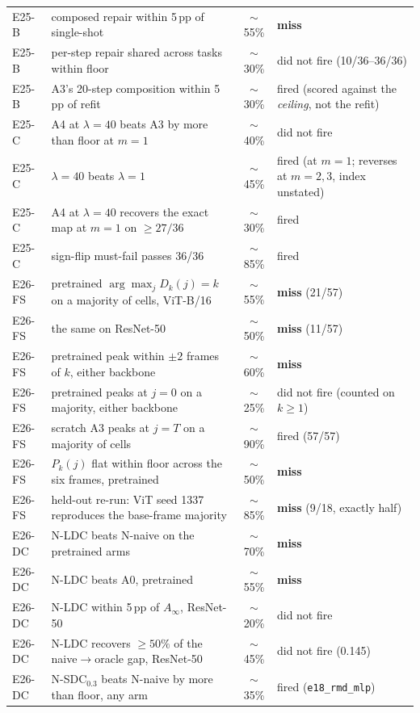 \begin{center}
\begin{tabular}{@{}llcl@{}}
E25-B & composed repair within 5\,pp of single-shot & $\sim$55\% & \textbf{miss} \\
E25-B & per-step repair shared across tasks within floor & $\sim$30\% & did not fire (10/36--36/36) \\
E25-B & A3's 20-step composition within 5\,pp of refit & $\sim$30\% & fired (scored against the \emph{ceiling}, not the refit) \\
E25-C & A4 at $\lambda=40$ beats A3 by more than floor at $m=1$ & $\sim$40\% & did not fire \\
E25-C & $\lambda=40$ beats $\lambda=1$ & $\sim$45\% & fired (at $m=1$; reverses at $m=2,3$, index unstated) \\
E25-C & A4 at $\lambda=40$ recovers the exact map at $m=1$ on $\ge 27/36$ & $\sim$30\% & fired \\
E25-C & sign-flip must-fail passes 36/36 & $\sim$85\% & fired \\
E26-FS & pretrained $\arg\max_j D_k(j) = k$ on a majority of cells, ViT-B/16 & $\sim$55\% & \textbf{miss} (21/57) \\
E26-FS & the same on ResNet-50 & $\sim$50\% & \textbf{miss} (11/57) \\
E26-FS & pretrained peak within $\pm2$ frames of $k$, either backbone & $\sim$60\% & \textbf{miss} \\
E26-FS & pretrained peaks at $j=0$ on a majority, either backbone & $\sim$25\% & did not fire (counted on $k\ge1$) \\
E26-FS & scratch A3 peaks at $j=T$ on a majority of cells & $\sim$90\% & fired (57/57) \\
E26-FS & $P_k(j)$ flat within floor across the six frames, pretrained & $\sim$50\% & \textbf{miss} \\
E26-FS & held-out re-run: ViT seed 1337 reproduces the base-frame majority & $\sim$85\% & \textbf{miss} (9/18, exactly half) \\
E26-DC & N-LDC beats N-naive on the pretrained arms & $\sim$70\% & \textbf{miss} \\
E26-DC & N-LDC beats A0, pretrained & $\sim$55\% & \textbf{miss} \\
E26-DC & N-LDC within 5\,pp of $A_\infty$, ResNet-50 & $\sim$20\% & did not fire \\
E26-DC & N-LDC recovers $\ge 50\%$ of the naive$\to$oracle gap, ResNet-50 & $\sim$45\% & did not fire (0.145) \\
E26-DC & N-SDC$_{0.3}$ beats N-naive by more than floor, any arm & $\sim$35\% & fired (\texttt{e18\_rmd\_mlp}) \\

\end{tabular}
\end{center}
